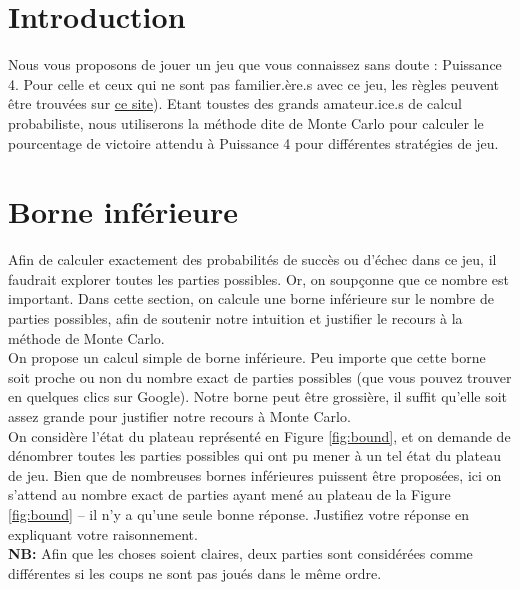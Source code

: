 \documentclass[11pt,answers]{exam}
\begin{document}
\section*{Introduction}

Nous vous proposons de jouer un jeu que vous connaissez sans doute : Puissance 4. Pour celle et ceux qui ne sont pas familier.ère.s avec ce jeu, les règles peuvent être trouvées sur \href{https://www.regles-de-jeux.com/regle-du-puissance-4/}{ce site}). Etant toustes des grands amateur.ice.s de calcul probabiliste, nous utiliserons la méthode dite de Monte Carlo pour calculer le pourcentage de victoire attendu à Puissance 4 pour différentes stratégies de jeu. 



\bigskip


\section{Borne inférieure} \label{sec:borne_inf}

Afin de calculer exactement des probabilités de succès ou d'échec dans ce jeu, il faudrait explorer toutes les parties possibles. Or, on soupçonne que ce nombre est important. Dans cette section, on calcule une borne inférieure sur le nombre de parties possibles, afin de soutenir notre intuition et justifier le recours à la méthode de Monte Carlo.\\

On propose un calcul simple de borne inférieure. Peu importe que cette borne soit proche ou non du nombre exact de parties possibles (que vous pouvez trouver en quelques clics sur Google). Notre borne peut être grossière, il suffit qu'elle soit assez grande pour justifier notre recours à Monte Carlo.\\

On considère l'état du plateau représenté en Figure \ref{fig:bound}, et on demande de dénombrer toutes les parties possibles qui ont pu mener à un tel état du plateau de jeu. Bien que de nombreuses bornes inférieures puissent être proposées, ici on s'attend au nombre exact de parties ayant mené au plateau de la Figure \ref{fig:bound} -- il n'y a qu'une seule bonne réponse. Justifiez votre réponse en expliquant votre raisonnement.\\

\textbf{NB:} Afin que les choses soient claires, deux parties sont considérées comme différentes si les coups ne sont pas joués dans le même ordre.
\end{document}
